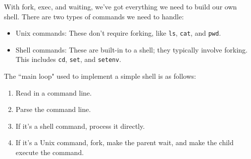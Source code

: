With fork, exec, and waiting, we've got everything we need to build our own shell. There are two types of commands we need to handle: \begin{itemize}
    \item Unix commands: These don't require forking, like \verb!ls!, \verb!cat!, and \verb!pwd!.
    \item Shell commands: These are built-in to a shell; they typically involve forking. This includes \verb!cd!, \verb!set!, and \verb!setenv!.
\end{itemize}

The ``main loop" used to implement a simple shell is as follows: \begin{enumerate}
    \item Read in a command line.
    \item Parse the command line.
    \item If it's a shell command, process it directly.
    \item If it's a Unix command, fork, make the parent wait, and make the child execute the command. 
\end{enumerate} 